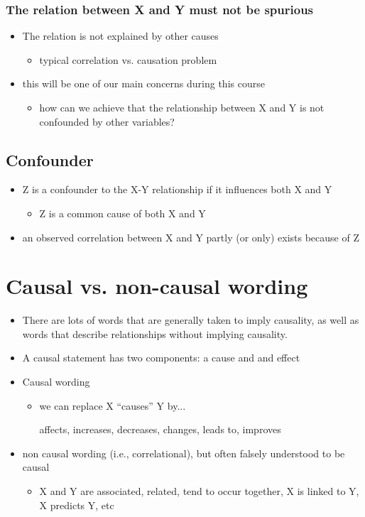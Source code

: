\documentclass[10pt]{article}
\begin{document}
\subsubsection{The relation between X and Y must not be spurious}
\begin{itemize}
    \item The relation is not explained by other causes 
    \begin{itemize}
        \item typical correlation vs. causation problem 
    \end{itemize}
    \item this will be one of our main concerns during this course 
    \begin{itemize}
        \item how can we achieve that the relationship between X and Y is not confounded by other variables?
    \end{itemize}
\end{itemize}
\subsection{Confounder}
\begin{itemize}
    \item Z is a confounder to the X-Y relationship if it influences both X and Y 
    \begin{itemize}
        \item Z is a common cause of both X and Y 
    \end{itemize}
    \item an observed correlation between X and Y partly (or only) exists because of Z
\end{itemize}
\newpage 
\section{Causal vs. non-causal wording}
\begin{itemize}
    \item There are lots of words that are generally taken to imply causality, as well as words that describe relationships without implying causality.
    \item A causal statement has two components: a cause and and effect 
    \item Causal wording 
    \begin{itemize}
        \item we can replace X ``causes'' Y by... 

        affects, increases, decreases, changes, leads to, improves
    \end{itemize}
    \item non causal wording (i.e., correlational), but often falsely understood to be causal 
    \begin{itemize}
        \item X and Y are associated, related, tend to occur together, X is linked to Y, X predicts Y, etc
    \end{itemize}
\end{itemize}
\end{document}
